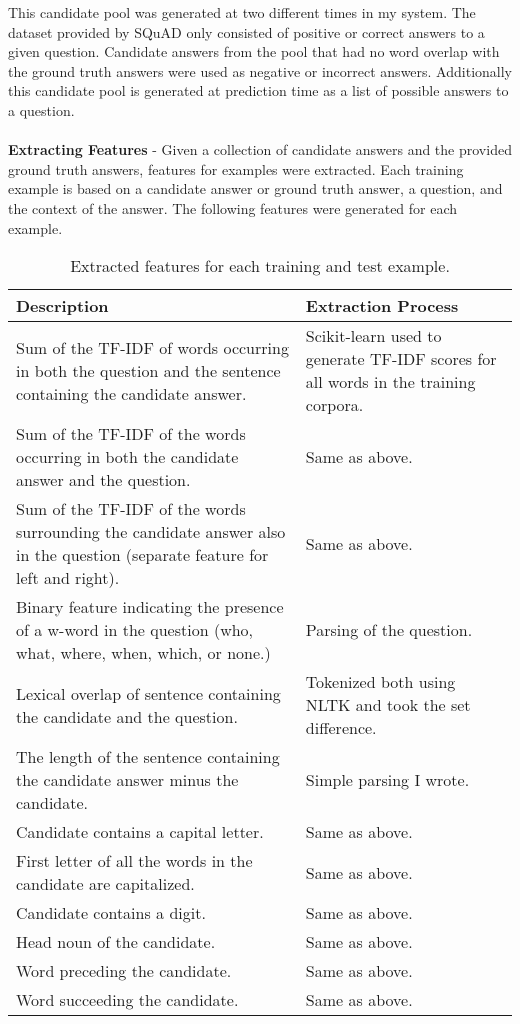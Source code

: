 \documentclass[a4paper, 11pt]{article} %
\begin{document}
This candidate pool was generated at two different times in my system. The dataset provided by SQuAD only consisted of positive or correct answers to a given question. Candidate answers from the pool that had no word overlap with the ground truth answers were used as negative or incorrect answers. Additionally this candidate pool is generated at prediction time as a list of possible answers to a question.
\\~\\
\textbf{Extracting Features} - Given a collection of candidate answers and the provided ground truth answers, features for examples were extracted. Each training example is based on a candidate answer or ground truth answer, a question, and the context of the answer. The following features were generated for each example.
\begin{table}[H]
\centering
{\renewcommand{\arraystretch}{1.2}%
\begin{tabular}{|p{8cm}|p{4cm}|}
\hline
Description & Extraction Process\\
\hline
\hline
Sum of the TF-IDF of words occurring in both the question and the sentence containing the candidate answer. & Scikit-learn used to generate TF-IDF scores for all words in the training corpora. \\ \hline
Sum of the TF-IDF of the words occurring in both the candidate answer and the question. & Same as above.\\ \hline
Sum of the TF-IDF of the words surrounding the candidate answer also in the question (separate feature for left and right). & Same as above.\\ \hline
Binary feature indicating the presence of a w-word in the question (who, what, where, when, which, or none.) & Parsing of the question.\\ \hline
Lexical overlap of sentence containing the candidate and the question. & Tokenized both using NLTK and took the set difference.\\ \hline
The length of the sentence containing the candidate answer minus the candidate. & Simple parsing I wrote.\\ \hline
Candidate contains a capital letter. & Same as above.\\ \hline
First letter of all the words in the candidate are capitalized. & Same as above.\\ \hline
Candidate contains a digit. & Same as above.\\ \hline
Head noun of the candidate. & Same as above.\\ \hline
Word preceding the candidate. & Same as above.\\ \hline
Word succeeding the candidate. & Same as above.\\ \hline
\end{tabular}}
\caption{Extracted features for each training and test example.}
\end{table}
\end{document}
